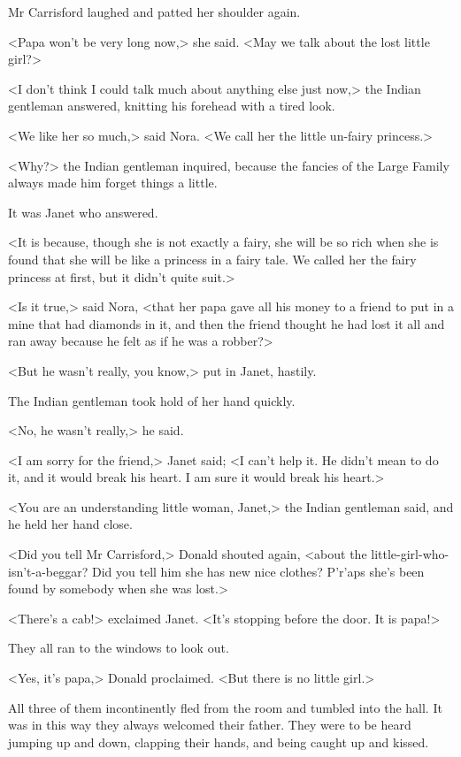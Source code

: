 Mr Carrisford laughed and patted her shoulder again.

<Papa won't be very long now,> she said. <May we talk about the lost little girl?>

<I don't think I could talk much about anything else just now,> the Indian gentleman answered, knitting his forehead with a tired look.

<We like her so much,> said Nora. <We call her the little un-fairy princess.>

<Why?> the Indian gentleman inquired, because the fancies of the Large Family always made him forget things a little.

It was Janet who answered.

<It is because, though she is not exactly a fairy, she will be so rich when she is found that she will be like a princess in a fairy tale. We called her the fairy princess at first, but it didn't quite suit.>

<Is it true,> said Nora, <that her papa gave all his money to a friend to put in a mine that had diamonds in it, and then the friend thought he had lost it all and ran away because he felt as if he was a robber?>

<But he wasn't really, you know,> put in Janet, hastily.

The Indian gentleman took hold of her hand quickly.

<No, he wasn't really,> he said.

<I am sorry for the friend,> Janet said; <I can't help it. He didn't mean to do it, and it would break his heart. I am sure it would break his heart.>

<You are an understanding little woman, Janet,> the Indian gentleman said, and he held her hand close.

<Did you tell Mr Carrisford,> Donald shouted again, <about the little-girl-who-isn't-a-beggar? Did you tell him she has new nice clothes? P'r'aps she's been found by somebody when she was lost.>

<There's a cab!> exclaimed Janet. <It's stopping before the door. It is papa!>

They all ran to the windows to look out.

<Yes, it's papa,> Donald proclaimed. <But there is no little girl.>

All three of them incontinently fled from the room and tumbled into the hall. It was in this way they always welcomed their father. They were to be heard jumping up and down, clapping their hands, and being caught up and kissed.

